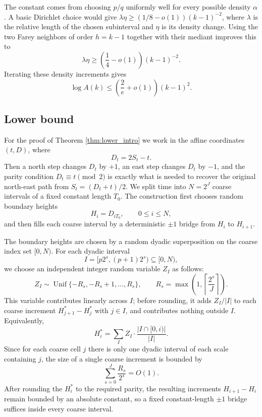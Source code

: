 \documentclass[10pt,a4paper]{amsart}
\newcommand{\1}{\mathbf 1}
\begin{document}
\bigskip
\noindent
The constant comes from choosing $p/q$ uniformly well for every possible density $\alpha$. A basic Dirichlet choice would give $\lambda\eta\ge (1/8-o(1))(k-1)^{-2}$, where $\lambda$ is the relative length of the chosen subinterval and $\eta$ is its density change. Using the two Farey neighbors of order $h=k-1$ together with their mediant improves this to
\[
\lambda\eta\ge \left(\frac14-o(1)\right)(k-1)^{-2}.
\]
Iterating these density increments gives
\[
\log A(k)\le \left(\frac2e+o(1)\right)(k-1)^2.
\]

\subsection{Lower bound}

For the proof of Theorem \ref{thm:lower_intro} we work in the affine coordinates $(t,D)$, where
\[
D_t=2S_t-t.
\]
Then a north step changes $D_t$ by $+1$, an east step changes $D_t$ by $-1$, and the parity condition $D_t\equiv t\pmod 2$ is exactly what is needed to recover the original north-east path from $S_t=(D_t+t)/2$. We split time into $N=2^J$ coarse intervals of a fixed constant length $T_0$. The construction first chooses random boundary heights
\[
H_i=D_{iT_0},\qquad 0\le i\le N,
\]
and then fills each coarse interval by a deterministic $\pm1$ bridge from $H_i$ to $H_{i+1}$.

\bigskip
\noindent
The boundary heights are chosen by a random dyadic superposition on the coarse index set $[0,N)$. For each dyadic interval
\[
I=[p2^s,(p+1)2^s)\subseteq[0,N),
\]
we choose an independent integer random variable $Z_I$ as follows:
\[
Z_I\sim \operatorname{Unif}\{-R_s,-R_s+1,\ldots,R_s\},
\qquad
R_s=\max\left(1,\left\lceil\frac{2^s}{J}\right\rceil\right).
\]
This variable contributes linearly across $I$; before rounding, it adds $Z_I/|I|$ to each coarse increment $H_{j+1}^*-H_j^*$ with $j\in I$, and contributes nothing outside $I$. Equivalently,
\[
H_i^*=\sum_I Z_I\cdot\frac{|I\cap[0,i)|}{|I|}.
\]
Since for each coarse cell $j$ there is only one dyadic interval of each scale containing $j$, the size of a single coarse increment is bounded by
\[
\sum_{s=0}^J \frac{R_s}{2^s}=O(1).
\]
After rounding the $H_i^*$ to the required parity, the resulting increments $H_{i+1}-H_i$ remain bounded by an absolute constant, so a fixed constant-length $\pm1$ bridge suffices inside every coarse interval.
\end{document}
